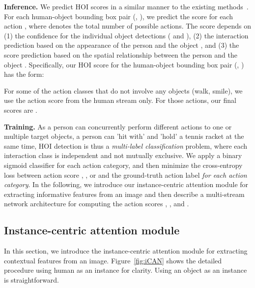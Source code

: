 \documentclass{bmvc2k}
\newlength\secmargin
\newcommand {\para}[1]{\vspace{1.5mm} \noindent \textbf{#1}}
\newcommand{\figref}[1]{Figure~\ref{fig:#1}}
\newcommand {\jiabin}[1]{{\color{blue}\textbf{Jia-Bin: }#1}\normalfont}
\renewcommand{\jiabin}[1]{}
\begin{document}
\para{Inference.} 
We predict HOI scores in a similar manner to the existing methods~\cite{Gupta-SemanticRoleLabeling,Gkioxari-CVPR-InteractNet}.
For each human-object bounding box pair (, ), we predict the score  for each action , where  denotes the total number of possible actions.
The score  depends on  
(1) the confidence for the individual object detections ( and ), 
(2) the interaction prediction based on the appearance of the person  and the object , and 
(3) the score prediction based on the spatial relationship between the person and the object .
Specifically, our HOI score  for the human-object bounding box pair (, ) has the form:

For some of the action classes that do not involve any objects (\eg walk, smile), we use the action score  from the human stream only. 
For those actions, our final scores are .

\para{Training.} 
As a person can concurrently perform different actions to one or multiple target objects, \eg a person can 'hit with' and 'hold' a tennis racket at the same time, HOI detection is thus a \emph{multi-label classification} problem, where each interaction class is independent and not mutually exclusive. 
We apply a binary sigmoid classifier for each action category, and then minimize the cross-entropy loss between action score , , or  and the ground-truth action label \emph{for each action category}.
In the following, we introduce our instance-centric attention module for extracting informative features from an image and then describe a multi-stream network architecture for computing the action scores , , and .


\jiabin{Same here. Pairwise stream is not defined yet.}






\subsection{Instance-centric attention module}
\label{sec:attention}
\vspace{\secmargin}



In this section, we introduce the instance-centric attention module for extracting contextual features from an image.
\figref{iCAN} shows the detailed procedure using human as an instance for clarity.
Using an object as an instance is straightforward.
\end{document}
